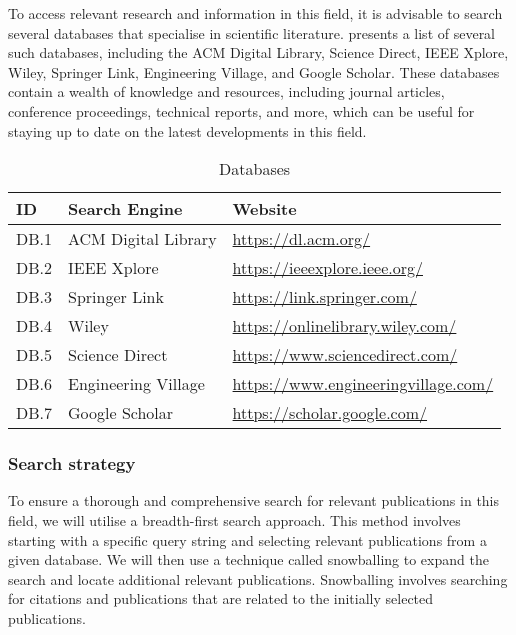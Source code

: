 To access relevant research and information in this field, it is advisable to
search several databases that specialise in scientific literature.
 presents a list of several such databases, including the
ACM Digital Library, Science Direct, IEEE Xplore, Wiley, Springer Link,
Engineering Village, and Google Scholar. These databases contain a wealth of
knowledge and resources, including journal articles, conference proceedings,
technical reports, and more, which can be useful for staying up to date on the
latest developments in this field.

\begin{table}[!htb] \caption{Databases} \label{tab:databases}
  \begin{center}
    \begin{tabular}[c]{l|l|l} \textbf{ID} & \textbf{Search Engine} &
      \textbf{Website} \\
      \hline DB.1 & ACM Digital Library & \url{https://dl.acm.org/} \\
      \hline DB.2 & IEEE Xplore & \url{https://ieeexplore.ieee.org/} \\
      \hline DB.3 & Springer Link & \url{https://link.springer.com/} \\
      \hline DB.4 & Wiley & \url{https://onlinelibrary.wiley.com/} \\
      \hline DB.5 & Science Direct & \url{https://www.sciencedirect.com/} \\
      \hline DB.6 & Engineering Village &
      \url{https://www.engineeringvillage.com/} \\
      \hline DB.7 & Google Scholar & \url{https://scholar.google.com/} \\
    \end{tabular}
  \end{center}
\end{table}

\subsubsection{Search strategy}

To ensure a thorough and comprehensive search for relevant publications in this
field, we will utilise a breadth-first search approach. This method involves
starting with a specific query string and selecting relevant publications from
a given database. We will then use a technique called snowballing to expand the
search and locate additional relevant publications. Snowballing involves
searching for citations and publications that are related to the initially
selected publications.

